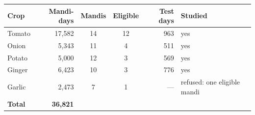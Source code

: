 \renewcommand{\arraystretch}{1.25}
\footnotesize
\begin{tabular}{|l|r|c|c|r|l|}
\hline
\textbf{Crop} & \textbf{Mandi-days} & \textbf{Mandis} & \textbf{Eligible} & \textbf{Test days} & \textbf{Studied} \\
\hline
Tomato & 17,582 & 14 & 12 & 963 & yes \\
\hline
Onion & 5,343 & 11 & 4 & 511 & yes \\
\hline
Potato & 5,000 & 12 & 3 & 569 & yes \\
\hline
Ginger & 6,423 & 10 & 3 & 776 & yes \\
\hline
Garlic & 2,473 & 7 & 1 & --- & refused: one eligible mandi \\
\hline
\textbf{Total} & \textbf{36,821} &  &  &  &  \\
\hline
\end{tabular}
